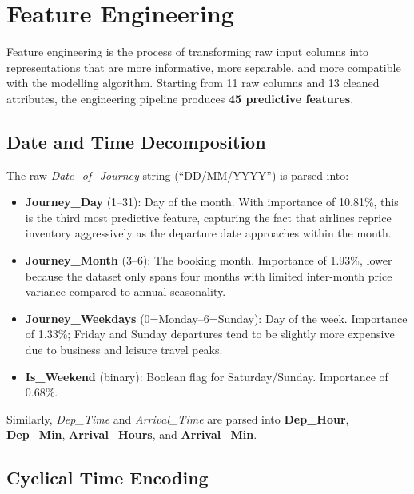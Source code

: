 \documentclass[12pt, a4paper]{article}
\begin{document}
\section{Feature Engineering}
\label{sec:features}

Feature engineering is the process of transforming raw input columns into
representations that are more informative, more separable, and more compatible
with the modelling algorithm.  Starting from 11 raw columns and 13 cleaned
attributes, the engineering pipeline produces \textbf{45 predictive features}.

\subsection{Date and Time Decomposition}

The raw \textit{Date\_of\_Journey} string (``DD/MM/YYYY'') is parsed into:
\begin{itemize}
    \item \textbf{Journey\_Day} (1--31): Day of the month.  With importance of
    10.81\%, this is the third most predictive feature, capturing the fact that
    airlines reprice inventory aggressively as the departure date approaches
    within the month.
    \item \textbf{Journey\_Month} (3--6): The booking month.  Importance of
    1.93\%, lower because the dataset only spans four months with limited
    inter-month price variance compared to annual seasonality.
    \item \textbf{Journey\_Weekdays} (0=Monday--6=Sunday): Day of the week.
    Importance of 1.33\%; Friday and Sunday departures tend to be slightly
    more expensive due to business and leisure travel peaks.
    \item \textbf{Is\_Weekend} (binary): Boolean flag for Saturday/Sunday.
    Importance of 0.68\%.
\end{itemize}

Similarly, \textit{Dep\_Time} and \textit{Arrival\_Time} are parsed into
\textbf{Dep\_Hour}, \textbf{Dep\_Min}, \textbf{Arrival\_Hours}, and
\textbf{Arrival\_Min}.

\subsection{Cyclical Time Encoding}
\end{document}
